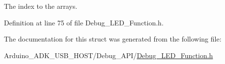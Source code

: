 The index to the arrays. 



Definition at line 75 of file Debug\-\_\-\-L\-E\-D\-\_\-\-Function.\-h.



The documentation for this struct was generated from the following file\-:\begin{DoxyCompactItemize}
\item 
Arduino\-\_\-\-A\-D\-K\-\_\-\-U\-S\-B\-\_\-\-H\-O\-S\-T/\-Debug\-\_\-\-A\-P\-I/\hyperlink{_debug___l_e_d___function_8h}{Debug\-\_\-\-L\-E\-D\-\_\-\-Function.\-h}\end{DoxyCompactItemize}
